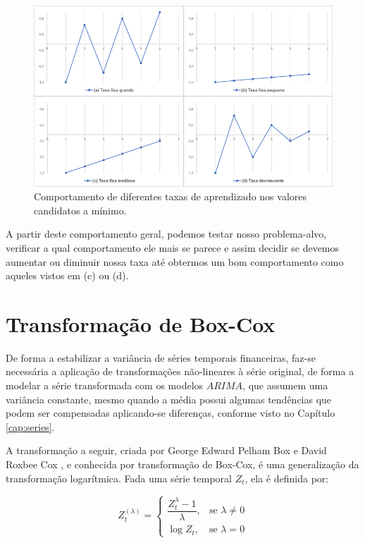 \begin{figure}[htb]
\centering
\includegraphics[width=14cm]{figuras/grad_4}
\caption{Comportamento de diferentes taxas de aprendizado nos valores candidatos a mínimo.}
\label{fig:grad_4}
\end{figure}

A partir deste comportamento geral, podemos testar nosso problema-alvo, verificar a qual comportamento ele mais se parece e assim decidir se devemos aumentar ou diminuir nossa taxa até obtermos um bom comportamento como aqueles vistos em (c) ou (d).



\chapter{Transformação de Box-Cox}
\label{ap:box-cox}

De forma a estabilizar a variância de séries temporais financeiras, faz-se necessária a aplicação de transformações não-lineares à série original, de forma a modelar a série transformada com os modelos $ARIMA$, que assumem uma variância constante, mesmo quando a média possui algumas tendências que podem ser compensadas aplicando-se diferenças, conforme visto no Capítulo \ref{cap:series}.

A transformação a seguir, criada por George Edward Pelham Box e David Roxbee Cox \citep{cox}, e conhecida por transformação de Box-Cox, é uma generalização da transformação logarítmica. Fada uma série temporal $Z_t$, ela é definida por:

\begin{equation}\label{eq:cox}
Z_t^{(\lambda)} = \left\{ \begin{array}{lr}\dfrac{Z_t^\lambda - 1}{\lambda},& \text{se } \lambda \neq 0\\\log{Z_t},& \text{se } \lambda = 0\end{array} \right.
\end{equation}

